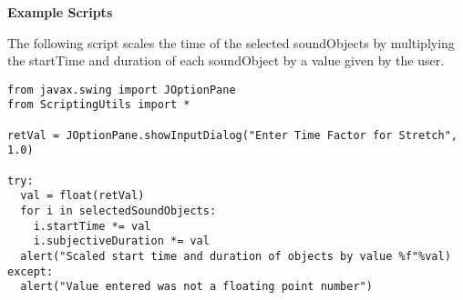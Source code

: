 \textbf{Example Scripts}

The following script scales the time of the selected soundObjects by
multiplying the startTime and duration of each soundObject by a value
given by the user.

\begin{verbatim}
from javax.swing import JOptionPane
from ScriptingUtils import *

retVal = JOptionPane.showInputDialog("Enter Time Factor for Stretch", 1.0)

try:
  val = float(retVal)
  for i in selectedSoundObjects:
    i.startTime *= val
    i.subjectiveDuration *= val
  alert("Scaled start time and duration of objects by value %f"%val)
except:
  alert("Value entered was not a floating point number")
  
\end{verbatim}
